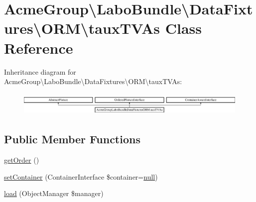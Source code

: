 \hypertarget{class_acme_group_1_1_labo_bundle_1_1_data_fixtures_1_1_o_r_m_1_1taux_t_v_as}{\section{Acme\+Group\textbackslash{}Labo\+Bundle\textbackslash{}Data\+Fixtures\textbackslash{}O\+R\+M\textbackslash{}taux\+T\+V\+As Class Reference}
\label{class_acme_group_1_1_labo_bundle_1_1_data_fixtures_1_1_o_r_m_1_1taux_t_v_as}
}
Inheritance diagram for Acme\+Group\textbackslash{}Labo\+Bundle\textbackslash{}Data\+Fixtures\textbackslash{}O\+R\+M\textbackslash{}taux\+T\+V\+As\+:\begin{figure}[H]
\begin{center}
\leavevmode
\includegraphics[height=1.152263cm]{class_acme_group_1_1_labo_bundle_1_1_data_fixtures_1_1_o_r_m_1_1taux_t_v_as}
\end{center}
\end{figure}
\subsection*{Public Member Functions}
\begin{DoxyCompactItemize}
\item 
\hyperlink{class_acme_group_1_1_labo_bundle_1_1_data_fixtures_1_1_o_r_m_1_1taux_t_v_as_a4b63059349e3ae01ab74331f6cc29c68}{get\+Order} ()
\item 
\hyperlink{class_acme_group_1_1_labo_bundle_1_1_data_fixtures_1_1_o_r_m_1_1taux_t_v_as_a9d10cac0d3d4e8d695574cf3f78f6003}{set\+Container} (Container\+Interface \$container=\hyperlink{validate_8js_afb8e110345c45e74478894341ab6b28e}{null})
\item 
\hyperlink{class_acme_group_1_1_labo_bundle_1_1_data_fixtures_1_1_o_r_m_1_1taux_t_v_as_a7c77f3bd111ba7f92dec838d31fac04b}{load} (Object\+Manager \$manager)
\end{DoxyCompactItemize}


